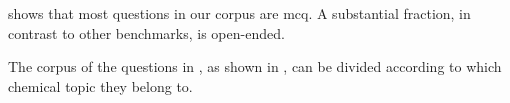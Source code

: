  shows that most questions in our corpus are \gls{mcq}.
A substantial fraction, in contrast to other benchmarks, is open-ended. 

The corpus of the questions in \chembench, as shown in , can be divided according to which chemical topic they belong to.

